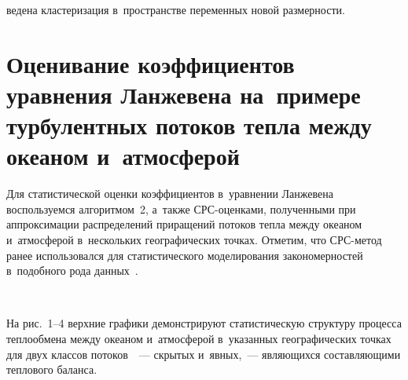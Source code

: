 \begin{multicols}{2}
 \pagebreak
 
 \noindent
 ведена клас\-те\-ри\-за\-ция в~пространстве 
 переменных новой раз\-мер\-ности.

\section{Оценивание коэффициентов уравнения Ланжевена 
на~примере турбулентных потоков тепла между океаном и~атмосферой}

Для статистической оценки коэффициентов в~уравнении Ланжевена
воспользуемся алгоритмом~2, а~так\-же СРС-оцен\-ка\-ми, 
полученными при аппроксимации распределений приращений потоков теп\-ла 
между океаном и~атмосферой в~нескольких географических точках. Отметим, 
что СРС-метод %
ранее использовался для 
статистического моделирования закономерностей в~подобного 
рода данных~\cite{Gorshenin2015b,Gorshenin2016}.

\setcounter{figure}{0}
\renewcommand{\figurename}{\protect\bf Рис.}
\begin{figure*} %
\vspace*{9pt}

\vspace*{1pt}
 \begin{center}
 \mbox{%
 \epsfxsize=156mm 
 }
 \end{center}
   \vspace*{-9pt}
\vspace*{9pt}
\end{figure*}


На рис.~1--4 %
верхние графики демонстрируют статистическую структуру процесса 
теп\-ло\-об\-ме\-на между океаном и~атмосферой в~указанных географических 
точках для двух классов потоков~\cite{Perry1977}~---  скрытых 
и~явных,~--- %
яв\-ля\-ющих\-ся со\-став\-ля\-ющи\-ми теп\-ло\-во\-го баланса.


\begin{figure*} %
\vspace*{1pt}
 \begin{center}
 \mbox{%
 \epsfxsize=156mm 
 }
 \end{center}
   \vspace*{-9pt}
\end{figure*}


\end{multicols}
